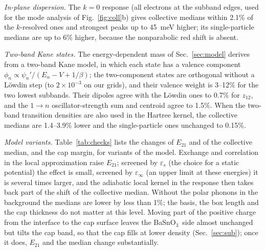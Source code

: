 \documentclass[11pt]{article}
\newcommand{\BSO}{\texorpdfstring{BaSnO$_3$}{BaSnO3}}
\begin{document}
\emph{In-plane dispersion.} The $k=0$ response (all electrons at the subband edges, used for the mode analysis of Fig.~\ref{fig:coll}b) gives collective medians within 2.1\% of the $k$-resolved ones and strongest peaks up to 45~meV higher; its single-particle medians are up to 6\% higher, because the nonparabolic red shift is absent.

\emph{Two-band Kane states.} The energy-dependent mass of Sec.~\ref{sec:model} derives from a two-band Kane model, in which each state has a valence component $\phi_n\propto\psi_n'/(E_n-V+1/\beta)$; the two-component states are orthogonal without a L\"owdin step (to $2\times10^{-3}$ on our grids), and their valence weight is 3--12\% for the two lowest subbands. Their dipoles agree with the L\"owdin ones to 0.7\% for $z_{12}$, and the $1\to n$ oscillator-strength sum and centroid agree to 1.5\%. When the two-band transition densities are also used in the Hartree kernel, the collective medians are 1.4--3.9\% lower and the single-particle ones unchanged to 0.15\%.

\emph{Model variants.} Table~\ref{tab:checks} lists the changes of $E_{21}$ and of the collective median, and the cap margin, for variants of the model. Exchange and correlation in the local approximation raise $E_{21}$; screened by $\varepsilon_s$ (the choice for a static potential) the effect is small, screened by $\varepsilon_\infty$ (an upper limit at these energies) it is several times larger, and the adiabatic local kernel in the response then takes back part of the shift of the collective median. Without the polar phonons in the background the medians are lower by less than 1\%; the basis, the box length and the cap thickness do not matter at this level. Moving part of the positive charge from the interface to the cap surface leaves the \BSO\ side almost unchanged but tilts the cap band, so that the cap fills at lower density (Sec.~\ref{sec:sub}); once it does, $E_{21}$ and the median change substantially.
\end{document}
